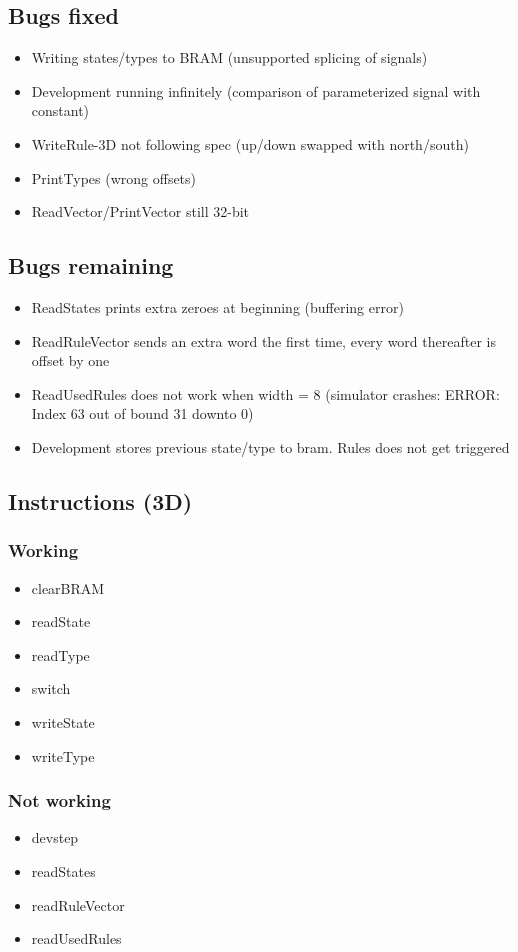 \subsection{Bugs fixed}

\begin{itemize}
    \item Writing states/types to BRAM (unsupported splicing of signals)
    \item Development running infinitely (comparison of parameterized signal with constant)
    \item WriteRule-3D not following spec (up/down swapped with north/south)
    \item PrintTypes (wrong offsets)
    \item ReadVector/PrintVector still 32-bit
\end{itemize}

\subsection{Bugs remaining}

\begin{itemize}
    \item ReadStates prints extra zeroes at beginning (buffering error)
    \item ReadRuleVector sends an extra word the first time, every word thereafter is offset by one
    \item ReadUsedRules does not work when width = 8 (simulator crashes: ERROR: Index 63 out of bound 31 downto 0)
    \item Development stores previous state/type to bram. Rules does not get triggered
\end{itemize}

\subsection{Instructions (3D)}

\subsubsection{Working}

\begin{itemize}
    \item clearBRAM
    \item readState
    \item readType
    \item switch
    \item writeState
    \item writeType
\end{itemize}

\subsubsection{Not working}

\begin{itemize}
    \item devstep
    \item readStates
    \item readRuleVector
    \item readUsedRules
\end{itemize}

